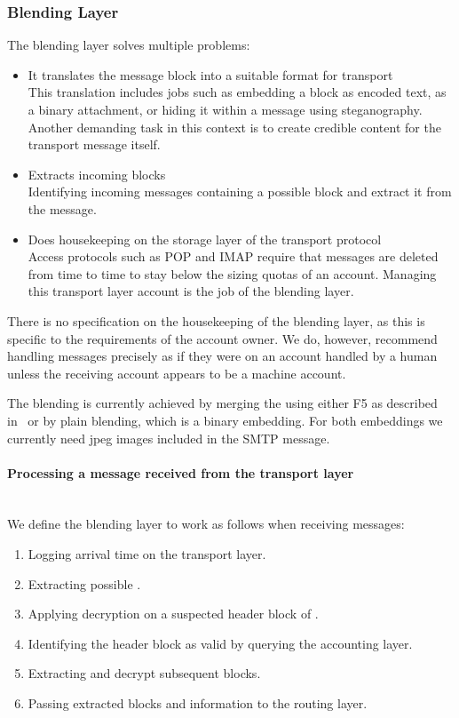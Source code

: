 \subsubsection{Blending Layer}\label{sec:blendingLayer}
The blending layer solves multiple problems:
\begin{itemize}
	\item It translates the message block into a suitable format for transport\\
	This translation includes jobs such as embedding a block as encoded text, as a binary attachment, or hiding it within a message using steganography. Another demanding task in this context is to create credible content for the transport message itself.
	\item Extracts incoming blocks\\
	Identifying incoming messages containing a possible block and extract it from the message.
	\item Does housekeeping on the storage layer of the transport protocol\\
	Access protocols such as POP and IMAP require that messages are deleted from time to time to stay below the sizing quotas of an account. Managing this transport layer account is the job of the blending layer.
\end{itemize}

There is no specification on the housekeeping of the blending layer, as this is specific to the requirements of the account owner. We do, however, recommend handling messages precisely as if they were on an account handled by a human unless the receiving account appears to be a machine account. 

The blending is currently achieved by merging the \VortexMessage{} using either F5 as described in~\cite{f5} or by plain blending, which is a binary embedding. For both embeddings we currently need jpeg images included in the SMTP message. 

\paragraph{Processing a message received from the transport layer}~\\
We define the blending layer to work as follows when receiving messages:
\begin{enumerate}
	\item Logging arrival time on the transport layer.
	\item Extracting possible \VortexMessage.
	\item Applying decryption on a suspected header block of \VortexMessage.
	\item Identifying the header block as valid by querying the accounting layer.
	\item Extracting and decrypt subsequent blocks.
	\item Passing extracted blocks and information to the routing layer.
\end{enumerate}

